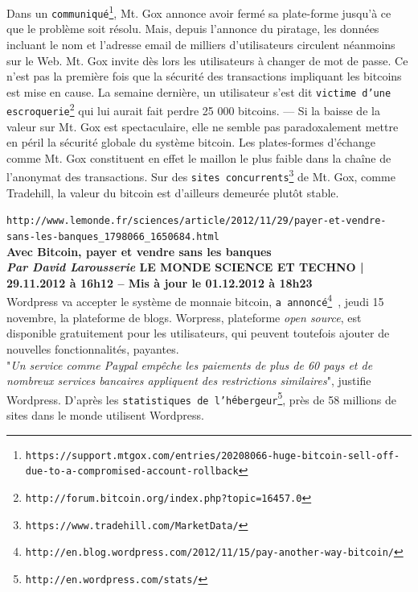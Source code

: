 \documentclass[11pt,twoside,a4paper]{article}
\begin{document}
Dans un \texttt{communiqu{\'e}\footnote{\texttt{https://support.mtgox.com/entries/20208066-huge-bitcoin-sell-off-due-to-a-compromised-account-rollback}}}, Mt. Gox annonce avoir ferm{\'e} sa plate-forme jusqu'{\`a} ce que le probl{\`e}me soit r{\'e}solu. Mais, depuis l'annonce du piratage, les donn{\'e}es incluant le nom et l'adresse email de milliers d'utilisateurs circulent n{\'e}anmoins sur le Web. Mt. Gox invite d{\`e}s lors les utilisateurs {\`a} changer de mot de passe. Ce n'est pas la premi{\`e}re fois que la s{\'e}curit{\'e} des transactions impliquant les bitcoins est mise en cause. La semaine derni{\`e}re, un utilisateur s'est dit \texttt{victime d'une escroquerie\footnote{\texttt{http://forum.bitcoin.org/index.php?topic=16457.0}}} qui lui aurait fait perdre 25 000 bitcoins. --- Si la baisse de la valeur sur Mt. Gox est spectaculaire, elle ne semble pas paradoxalement mettre en p{\'e}ril la s{\'e}curit{\'e} globale du syst{\`e}me bitcoin. Les plates-formes d'{\'e}change comme Mt. Gox constituent en effet le maillon le plus faible dans la cha{\^i}ne de l'anonymat des transactions. Sur des \texttt{sites concurrents\footnote{\texttt{https://www.tradehill.com/MarketData/}}} de Mt. Gox, comme Tradehill, la valeur du bitcoin est d'ailleurs demeur{\'e}e plut{\^o}t stable. ~\\

\clearpage

\texttt{http://www.lemonde.fr/sciences/article/2012/11/29/payer-et-vendre-sans-les-banques\_1798066\_1650684.html}~\\

\textbf{Avec Bitcoin, payer et vendre sans les banques}~\\

\textbf{\small \emph{Par David Larousserie} LE MONDE SCIENCE ET TECHNO | 29.11.2012 {\`a} 16h12 -- Mis {\`a} jour le 01.12.2012 {\`a} 18h23 }~\\

Wordpress va accepter le syst{\`e}me de monnaie bitcoin, \texttt{a annonc{\'e}\footnote{\texttt{http://en.blog.wordpress.com/2012/11/15/pay-another-way-bitcoin/}} }, jeudi 15 novembre, la plateforme de blogs. Worpress, plateforme \emph{open source}, est disponible gratuitement pour les utilisateurs, qui peuvent toutefois ajouter de nouvelles fonctionnalit{\'e}s, payantes. ~\\

"\emph{Un service comme Paypal emp{\^e}che les paiements de plus de 60 pays et de nombreux services bancaires appliquent des restrictions similaires}", justifie Wordpress. D'apr{\`e}s les \texttt{statistiques de l'h{\'e}bergeur\footnote{\texttt{http://en.wordpress.com/stats/}}}, pr{\`e}s de 58 millions de sites dans le monde utilisent Wordpress. ~\\
\end{document}
